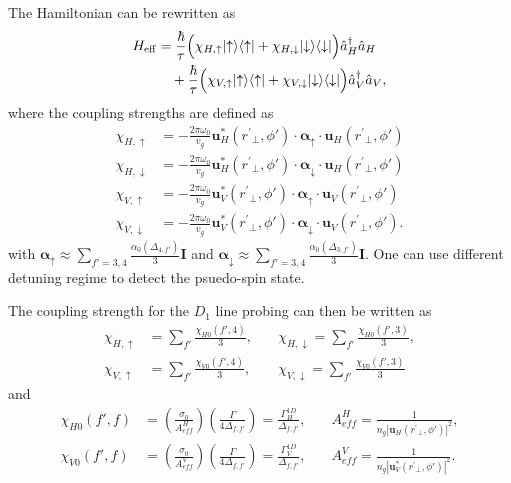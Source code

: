 \documentclass[preprint,aps,pra,onecolumn]{revtex4-1} %
\renewcommand{\tensor}[1]{\boldsymbol{#1}}
\begin{document}
The Hamiltonian can be rewritten as
\begin{align}
H_{\rm eff} & = \frac{ \hbar }{ \tau}\Big( \chi_{H,\uparrow}\lvert{\uparrow}\rangle\langle{\uparrow}\rvert +  \chi_{H,\downarrow} \lvert{\downarrow}\rangle\langle{\downarrow}\rvert \Big) \hat{a}_H^\dagger \hat{a}_H \nonumber\\
&\quad +  \frac{ \hbar }{ \tau} \Big( \chi_{V,\uparrow}\lvert{\uparrow}\rangle\langle{\uparrow}\rvert +  \chi_{V,\downarrow} \lvert{\downarrow}\rangle\langle{\downarrow}\rvert \Big) \hat{a}_V^\dagger \hat{a}_V  ,
\end{align}
where the coupling strengths are defined as
\begin{align}
\chi_{H,\uparrow} &=  -\frac{2\pi\omega_0}{v_g} \mathbf{u}^*_{H}(r^\prime\!\!_\perp,\phi') \cdot\tensor{\alpha}_{\uparrow}\cdot \mathbf{u}_{H}(r^\prime\!\!_\perp,\phi') \\
\chi_{H,\downarrow} &=  -\frac{2\pi\omega_0}{v_g} \mathbf{u}^*_{H}(r^\prime\!\!_\perp,\phi') \cdot\tensor{\alpha}_{\downarrow}\cdot \mathbf{u}_{H}(r^\prime\!\!_\perp,\phi') \\
\chi_{V,\uparrow} &=  -\frac{2\pi\omega_0}{v_g}  \mathbf{u}^*_{V}(r^\prime\!\!_\perp,\phi') \cdot\tensor{\alpha}_{\uparrow}\cdot \mathbf{u}_{V}(r^\prime\!\!_\perp,\phi')  \\
\chi_{V,\downarrow} &=  -\frac{2\pi\omega_0}{v_g}  \mathbf{u}^*_{V}(r^\prime\!\!_\perp,\phi') \cdot\tensor{\alpha}_{\downarrow}\cdot \mathbf{u}_{V}(r^\prime\!\!_\perp,\phi'). 
\end{align}
with $\tensor{\alpha}_{\uparrow} \approx\sum_{f'=3,4}\frac{\alpha_0(\Delta_{4,f'})}{3}\mathbf{I}$
and $\tensor{\alpha}_{\downarrow} \approx\sum_{f'=3,4}\frac{\alpha_0(\Delta_{3,f'})}{3}\mathbf{I}$.
One can use different detuning regime to detect the psuedo-spin state.

The coupling strength for the $ D_1 $ line probing can then be written as
\begin{align}
\chi_{H,\uparrow} &=  \sum_{f'} \frac{\chi_{H0}(f',4)}{3}, \quad
&\chi_{H,\downarrow} = \sum_{f'} \frac{\chi_{H0}(f',3) }{3}, \\
\chi_{V,\uparrow} &=  \sum_{f'} \frac{\chi_{V0}(f',4)}{3}, \quad
&\chi_{V,\downarrow} = \sum_{f'} \frac{\chi_{V0}(f',3) }{3} 
\end{align}
and 
\begin{align}
\chi_{H0}(f',f) &= \left( \frac{ \sigma_0}{A_{ef\!f}^H} \right) \left( \frac{\Gamma}{4 \Delta_{f,f'}} \right)=\frac{\Gamma_H^{1D}}{\Delta_{f,f'}},\quad
& A_{ef\!f}^H = \frac{1}{n_g|\mathbf{u}_{H}(r^\prime\!\!_\perp,\phi')|^2 },\\
\chi_{V0}(f',f) &= \left( \frac{ \sigma_0}{A_{ef\!f}^V} \right) \left( \frac{\Gamma}{4 \Delta_{f,f'}} \right)=\frac{\Gamma_V^{1D}}{\Delta_{f,f'}},\quad
& A_{ef\!f}^V = \frac{1}{n_g|\mathbf{u}^*_{V}(r^\prime\!\!_\perp,\phi')|^2 }.
\end{align}
\end{document}
